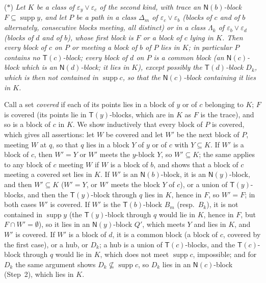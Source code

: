 \documentclass[11pt]{amsart}
\theoremstyle{definition}
\newcommand{\supp}{\operatorname{supp}}
\newcommand{\T}{\mathsf{T}}
\newcommand{\N}{\mathsf{N}}
\begin{document}
\textup{($*$)} \emph{Let $K$ be a class of $\varepsilon_y\vee\varepsilon_c$ of the second kind, with trace an $\N(b)$-block $F\subseteq\supp y$, and let $P$ be a path in a class $\Delta_m$ of $\varepsilon_c\vee\varepsilon_b$ (blocks of $c$ and of $b$ alternately, consecutive blocks meeting, all distinct) or in a class $\Lambda_k$ of $\varepsilon_b\vee\varepsilon_d$ (blocks of $d$ and of $b$), whose first block is $F$ or a block of $c$ lying in $K$. Then every block of $c$ on $P$ or meeting a block of $b$ of $P$ lies in $K$; in particular $P$ contains no $\T(c)$-block; every block of $d$ on $P$ is a common block (an $\N(c)$-block which is an $\N(d)$-block; it lies in $K$), except possibly the $\T(d)$-block $D_k$, which is then not contained in $\supp c$, so that the $\N(c)$-block containing it lies in $K$.}

Call a set \emph{covered} if each of its points lies in a block of $y$ or of $c$ belonging to $K$; $F$ is covered (its points lie in $\T(y)$-blocks, which are in $K$ as $F$ is the trace), and so is a block of $c$ in $K$. We show inductively that every block of $P$ is covered, which gives all assertions: let $W$ be covered and let $W'$ be the next block of $P$, meeting $W$ at $q$, so that $q$ lies in a block $Y$ of $y$ or of $c$ with $Y\subseteq K$. If $W'$ is a block of $c$, then $W'=Y$ or $W'$ meets the $y$-block $Y$, so $W'\subseteq K$; the same applies to any block of $c$ meeting $W$ if $W$ is a block of $b$, and shows that a block of $c$ meeting a covered set lies in $K$. If $W'$ is an $\N(b)$-block, it is an $\N(y)$-block, and then $W'\subseteq K$ ($W'=Y$, or $W'$ meets the block $Y$ of $c$), or a union of $\T(y)$-blocks, and then the $\T(y)$-block through $q$ lies in $K$, hence in $F$, so $W'=F$; in both cases $W'$ is covered. If $W'$ is the $\T(b)$-block $B_m$ (resp.\ $B_k$), it is not contained in $\supp y$ (the $\T(y)$-block through $q$ would lie in $K$, hence in $F$, but $F\cap W'=\emptyset$), so it lies in an $\N(y)$-block $Q'$, which meets $Y$ and lies in $K$, and $W'$ is covered. If $W'$ is a block of $d$, it is a common block (a block of $c$, covered by the first case), or a hub, or $D_k$; a hub is a union of $\T(c)$-blocks, and the $\T(c)$-block through $q$ would lie in $K$, which does not meet $\supp c$, impossible; and for $D_k$ the same argument shows $D_k\not\subseteq\supp c$, so $D_k$ lies in an $\N(c)$-block (Step~2), which lies in $K$.
\end{document}
